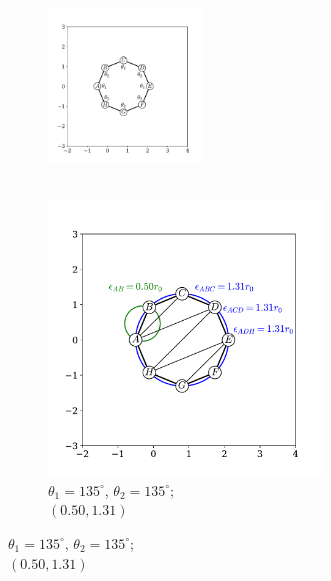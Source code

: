 \begin{figure}[tb]
	\centering
     
      \begin{subfigure}[b]{0.45\textwidth}
         \centering
         \includegraphics[width=0.45\textwidth]{./figures/ph/sl_oct_b4_135x.pdf}
         \caption{\phantom{xxx} \\ \phantom{xxx}}
         \label{fig:sloct}
     \end{subfigure}
     \hfill
     \begin{subfigure}[b]{0.45\textwidth}
         \centering
         \includegraphics[width=0.8\textwidth]{./figures/ph/sl_oct_b4_135.pdf}
         \caption{$\theta_1=135^\circ$, $\theta_2=135^\circ$; \\$\left(0.50,1.31\right)$}
         \label{fig:sloct}
     \end{subfigure}
     

\end{figure}
